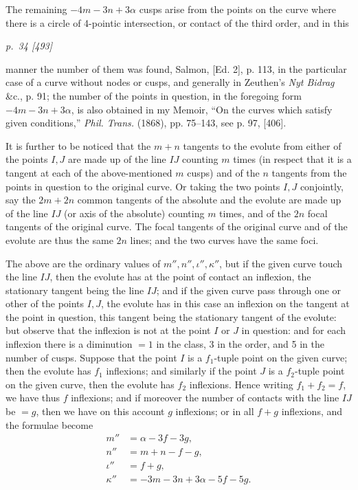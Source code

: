 ﻿\documentclass[11pt,a4paper]{article}
\theoremstyle{plain}
\theoremstyle{definition}
\begin{document}
The remaining \(-4m-3n+3\alpha\) cusps arise from the points on the curve
where there is a circle of 4-pointic intersection, or contact of the third
order, and in this

\clearpage
\textit{p.~34 [493]}

manner the number of them was found, Salmon, [Ed. 2], p. 113, in the
particular case of a curve without nodes or cusps, and generally in
Zeuthen's \textit{Nyt Bidrag} \&c., p. 91; the number of the points in
question, in the foregoing form \(-4m-3n+3\alpha\), is also obtained in my
Memoir, ``On the curves which satisfy given conditions,'' \textit{Phil.
Trans.} (1868), pp. 75--143, see p. 97, [406].

It is further to be noticed that the \(m+n\) tangents to the evolute from
either of the points \(I,J\) are made up of the line \(IJ\) counting \(m\)
times (in respect that it is a tangent at each of the above-mentioned \(m\)
cusps) and of the \(n\) tangents from the points in question to the
original curve. Or taking the two points \(I,J\) conjointly, say the
\(2m+2n\) common tangents of the absolute and the evolute are made up of
the line \(IJ\) (or axis of the absolute) counting \(m\) times, and of the
\(2n\) focal tangents of the original curve. The focal tangents of the
original curve and of the evolute are thus the same \(2n\) lines; and the
two curves have the same foci.

The above are the ordinary values of \(m'',n'',\iota'',\kappa''\), but if
the given curve touch the line \(IJ\), then the evolute has at the point of
contact an inflexion, the stationary tangent being the line \(IJ\); and if
the given curve pass through one or other of the points \(I,J\), the
evolute has in this case an inflexion on the tangent at the point in
question, this tangent being the stationary tangent of the evolute: but
observe that the inflexion is not at the point \(I\) or \(J\) in question:
and for each inflexion there is a diminution \(=1\) in the class, 3 in the
order, and 5 in the number of cusps. Suppose that the point \(I\) is a
\(f_1\)-tuple point on the given curve; then the evolute has \(f_1\)
inflexions; and similarly if the point \(J\) is a \(f_2\)-tuple point on
the given curve, then the evolute has \(f_2\) inflexions. Hence writing
\(f_1+f_2=f\), we have thus \(f\) inflexions; and if moreover the number
of contacts with the line \(IJ\) be \(=g\), then we have on this account
\(g\) inflexions; or in all \(f+g\) inflexions, and the formulae become
\[
\begin{aligned}
m''&=\alpha-3f-3g,\\
n''&=m+n-f-g,\\
\iota''&=f+g,\\
\kappa''&=-3m-3n+3\alpha-5f-5g.
\end{aligned}
\]
\end{document}
